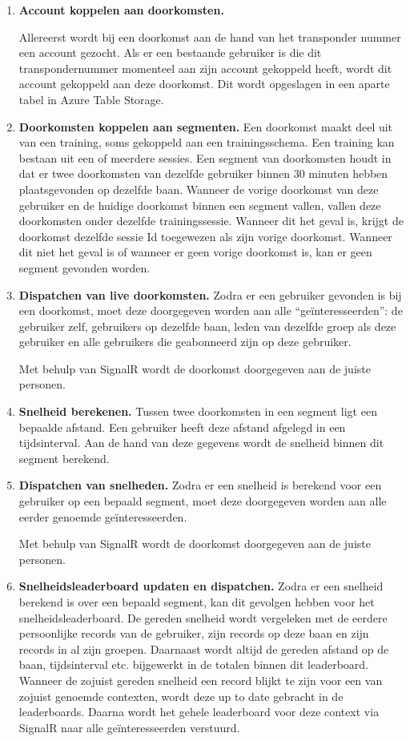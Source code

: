 \begin{enumerate}

\item \textbf{Account koppelen aan doorkomsten.}

Allereerst wordt bij een doorkomst aan de hand van het transponder nummer een account gezocht. Als er een bestaande gebruiker is die dit transpondernummer momenteel aan zijn account gekoppeld heeft, wordt dit account gekoppeld aan deze doorkomst. Dit wordt opgeslagen in een aparte tabel in Azure Table Storage.

\item \textbf{Doorkomsten koppelen aan segmenten.}
Een doorkomst maakt deel uit van een training, soms gekoppeld aan een trainingsschema. Een training kan bestaan uit een of meerdere sessies. Een segment van doorkomsten houdt in dat er twee doorkomsten van dezelfde gebruiker binnen 30 minuten hebben plaatsgevonden op dezelfde baan. Wanneer de vorige doorkomst van deze gebruiker en de huidige doorkomst binnen een segment vallen, vallen deze doorkomsten onder dezelfde trainingssessie. Wanneer dit het geval is, krijgt de doorkomst dezelfde sessie Id toegewezen als zijn vorige doorkomst. Wanneer dit niet het geval is of wanneer er geen vorige doorkomst is, kan er geen segment gevonden worden.

\item \textbf{Dispatchen van live doorkomsten.}
Zodra er een gebruiker gevonden is bij een doorkomst, moet deze doorgegeven worden aan alle ``geïnteresseerden'': de gebruiker zelf, gebruikers op dezelfde baan, leden van dezelfde groep als deze gebruiker en alle gebruikers die geabonneerd zijn op deze gebruiker.

Met behulp van SignalR wordt de doorkomst doorgegeven aan de juiste personen.

\item \textbf{Snelheid berekenen.}
Tussen twee doorkomsten in een segment ligt een bepaalde afstand. Een gebruiker heeft deze afstand afgelegd in een tijdsinterval. Aan de hand van deze gegevens wordt de snelheid binnen dit segment berekend.

\item \textbf{Dispatchen van snelheden.}
Zodra er een snelheid is berekend voor een gebruiker op een bepaald segment, moet deze doorgegeven worden aan alle eerder genoemde geïnteresseerden.

Met behulp van SignalR wordt de doorkomst doorgegeven aan de juiste personen.

\item \textbf{Snelheidsleaderboard updaten en dispatchen.}
Zodra er een snelheid berekend is over een bepaald segment, kan dit gevolgen hebben voor het snelheidsleaderboard. De gereden snelheid wordt vergeleken met de eerdere persoonlijke records van de gebruiker, zijn records op deze baan en zijn records in al zijn groepen. Daarnaast wordt altijd de gereden afstand op de baan, tijdsinterval etc. bijgewerkt in de totalen binnen dit leaderboard. Wanneer de zojuist gereden snelheid een record blijkt te zijn voor een van zojuist genoemde contexten, wordt deze up to date gebracht in de leaderboards. Daarna wordt het gehele leaderboard voor deze context via SignalR naar alle geïnteresseerden verstuurd.


\end{enumerate}
